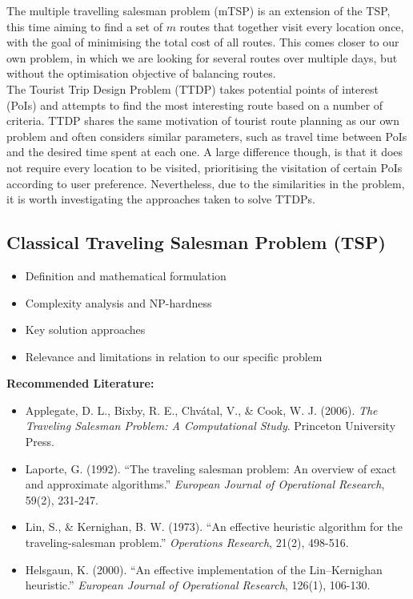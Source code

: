 \noindent
The multiple travelling salesman problem (mTSP) is an extension of the TSP, this time aiming to find a set of $m$
routes that together visit every location once, with the goal of minimising the total cost of all
routes\parencite[p. 209]{bektas2006multiple}.
This comes closer to our own problem, in which we are looking for several routes over multiple days, but without the
optimisation objective of balancing routes.\\

\noindent
The Tourist Trip Design Problem (TTDP) takes potential points of interest (PoIs) and attempts to find the most
interesting route based on a number of criteria.
TTDP shares the same motivation of tourist route planning as our own problem and often considers similar parameters,
such as travel time between PoIs and the desired time spent at each one\parencite{gavalas2014mobile}.
A large difference though, is that it does not require every location to be visited, prioritising the visitation of
certain PoIs according to user preference.
Nevertheless, due to the similarities in the problem, it is worth investigating the approaches taken to solve TTDPs.

\textcite{vansteenwegen2007mobile}



\subsection{Classical Traveling Salesman Problem (TSP)}
\begin{itemize}
    \item Definition and mathematical formulation
    \item Complexity analysis and NP-hardness
    \item Key solution approaches
    \item Relevance and limitations in relation to our specific problem
\end{itemize}

\noindent\textbf{Recommended Literature:}
\begin{itemize}
    \item Applegate, D. L., Bixby, R. E., Chvátal, V., \& Cook, W. J. (2006). \textit{The Traveling Salesman Problem: A Computational Study}. Princeton University Press.
    \item Laporte, G. (1992). ``The traveling salesman problem: An overview of exact and approximate algorithms.'' \textit{European Journal of Operational Research}, 59(2), 231-247.
    \item Lin, S., \& Kernighan, B. W. (1973). ``An effective heuristic algorithm for the traveling-salesman problem.'' \textit{Operations Research}, 21(2), 498-516.
    \item Helsgaun, K. (2000). ``An effective implementation of the Lin–Kernighan heuristic.'' \textit{European Journal of Operational Research}, 126(1), 106-130.
\end{itemize}

